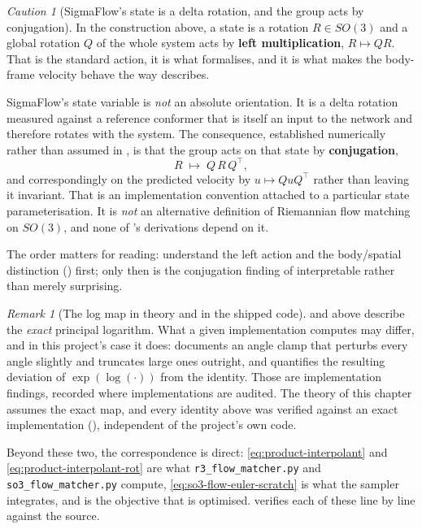 \documentclass[11pt,a4paper]{report}
\theoremstyle{definition}
\theoremstyle{remark}
\newtheorem{remark}[remark]{Remark}
\newtheorem{caution}[caution]{Caution}
\newcommand{\file}[1]{\texttt{#1}}
\begin{document}
\begin{caution}[SigmaFlow's state is a delta rotation, and the group acts by conjugation]
\label{caution:rfm-conjugation-preview}
In the construction above, a state is a rotation $R\in SO(3)$ and a global
rotation $Q$ of the whole system acts by \textbf{left multiplication},
$R\mapsto QR$. That is the standard action, it is what
 formalises, and it is what makes the body-frame
velocity behave the way  describes.

SigmaFlow's state variable is \emph{not} an absolute orientation. It is a
delta rotation measured against a reference conformer that is itself an
input to the network and therefore rotates with the system. The consequence,
established numerically rather than assumed in
, is that the group acts on that state by
\textbf{conjugation},
\[
R \;\longmapsto\; Q\,R\,Q^\top ,
\]
and correspondingly on the predicted velocity by $u\mapsto QuQ^\top$ rather
than leaving it invariant. That is an implementation convention attached to
a particular state parameterisation. It is \emph{not} an alternative
definition of Riemannian flow matching on $SO(3)$, and none of
's derivations depend on it.

The order matters for reading: understand the left action and the
body/spatial distinction () first; only then is
the conjugation finding of  interpretable rather
than merely surprising.
\end{caution}

\begin{remark}[The log map in theory and in the shipped code]
\label{rem:rfm-log-implementation-note}
 and  above describe
the \emph{exact} principal logarithm. What a given implementation computes
may differ, and in this project's case it does: 
documents an angle clamp that perturbs every angle slightly and truncates
large ones outright, and  quantifies the resulting
deviation of $\exp(\log(\cdot))$ from the identity. Those are
implementation findings, recorded where implementations are audited. The
theory of this chapter assumes the exact map, and every identity above was
verified against an exact implementation
(), independent of the project's own code.
\end{remark}

Beyond these two, the correspondence is direct:
\eqref{eq:product-interpolant} and \eqref{eq:product-interpolant-rot} are
what \file{r3\_flow\_matcher.py} and \file{so3\_flow\_matcher.py} compute,
\eqref{eq:so3-flow-euler-scratch} is what the sampler integrates, and
 is the objective that is optimised.
 verifies each of these line by line against the
source.
\end{document}
